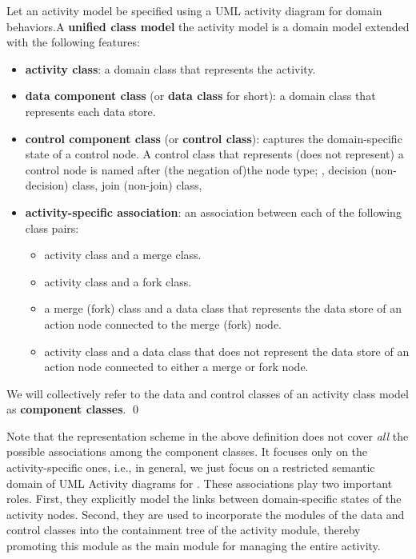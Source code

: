 \begin{definition} \label{def:unified-class-model}
	Let an activity model be specified using a UML activity diagram for domain behaviors.\linebreak A \textbf{unified class model} \wrt the activity model is a domain model extended with the following features:
	
	\begin{itemize}%
		\item \textbf{activity class}: a domain class that represents the activity.
		\item \textbf{data component class} (or \textbf{data class} for short): a domain class that represents each data store.
		\item \textbf{control component class} (or \textbf{control class}): captures the domain-specific state of a control node. A control class that represents (does not represent) a control node is named after (the negation of)\linebreak the node type; \eg, decision (non-decision) class, join (non-join) class, \etc
		\item \textbf{activity-specific association}: an association between each of the following class pairs:
		\begin{itemize}
			\item activity class and a merge class.
			\item activity class and a fork class.
			\item a merge (fork) class and a data class that represents the data store of an action node connected to the merge (fork) node.
			\item activity class and a data class that does not represent the data store of an action node connected to either a merge or fork node.
		\end{itemize}        	
	\end{itemize}
	We will collectively refer to the data and control classes of an activity class model as \textbf{component classes}. \qed
\end{definition}

Note that the representation scheme in the above definition does not cover \textit{all} the possible associations among the component classes. It focuses only on the activity-specific ones, i.e., in general, we just focus on a restricted semantic domain of UML Activity diagrams for \agl. %
%
These associations play two important roles. First, they explicitly model the links between domain-specific states of the activity nodes. Second, they are used to incorporate the modules of the data and control classes into the containment tree of the activity module, thereby promoting this module as the main module for managing the entire activity.

